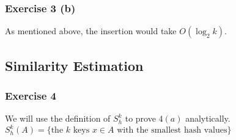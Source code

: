 \subsubsection{Exercise 3 (b)}
As mentioned above, the insertion would take \(O(\log_2 k)\).
\subsection{Similarity Estimation}
\subsubsection{Exercise 4}
We will use the definition of \(S_h^k \) to prove \(4(a)\) analytically. \(S_h^k(A) = \{\text{the } k \text{ keys } x \in A \text{ with the smallest hash values}\} \)
